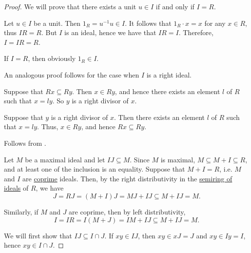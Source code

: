 \begin{proof}
   We will prove that there exists a unit \( u \in I \) if and only if \( I = R \).

  \SufficiencySubProof* Let \( u \in I \) be a unit. Then \( 1_R = u^{-1} u \in I \). It follows that \( 1_R \cdot x = x \) for any \( x \in R \), thus \( IR = R \). But \( I \) is an ideal, hence we have that \( IR = I \). Therefore, \( I = IR = R \).

  \NecessitySubProof* If \( I = R \), then obviously \( 1_R \in I \).

  An analogous proof follows for the case when \( I \) is a right ideal.


  \SufficiencySubProof* Suppose that \( Rx \subseteq Ry \). Then \( x \in Ry \), and hence there exists an element \( l \) of \( R \) such that \( x = ly \). So \( y \) is a right divisor of \( x \).

  \NecessitySubProof* Suppose that \( y \) is a right divisor of \( x \). Then there exists an element \( l \) of \( R \) such that \( x = ly \). Thus, \( x \in Ry \), and hence \( Rx \subseteq Ry \).

   Follows from .

   Let \( M \) be a maximal ideal and let \( IJ \subseteq M \). Since \( M \) is maximal, \( M \subseteq M + I \subseteq R \), and at least one of the inclusion is an equality. Suppose that \( M + I = R \), i.e. \( M \) and \( I \) are \hyperref[def:semiring_ideal/coprime]{coprime} ideals. Then, by the right distributivity in the \hyperref[thm:semiring_of_ideals/lattice]{semiring of ideals} of \( R \), we have
  \begin{equation*}
    J = RJ = (M + I)J = MJ + IJ \subseteq M + IJ = M.
  \end{equation*}

  Similarly, if \( M \) and \( J \) are coprime, then by left distributivity,
  \begin{equation*}
    I = IR = I(M + J) = IM + IJ \subseteq M + IJ = M.
  \end{equation*}

   We will first show that \( IJ \subseteq I \cap J \). If \( xy \in IJ \), then \( xy \in xJ = J \) and \( xy \in Iy = I \), hence \( xy \in I \cap J \).


\end{proof}
